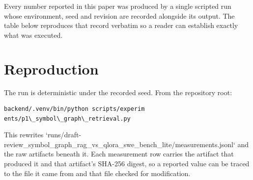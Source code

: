 \documentclass[10pt,journal,compsoc,twocolumn]{IEEEtran}
\begin{document}
Every number reported in this paper was produced by a single scripted run whose environment, seed and revision are recorded alongside its output. The table below reproduces that record verbatim so a reader can establish exactly what was executed.
\begin{table}[htbp]
\centering
{}
\end{table}


\section{Reproduction}


The run is deterministic under the recorded seed. From the repository root:


\begin{scriptsize}
\begin{verbatim}
backend/.venv/bin/python scripts/experim
ents/p1\_symbol\_graph\_retrieval.py
\end{verbatim}
\end{scriptsize}


This rewrites `runs/draft-review\_symbol\_graph\_rag\_vs\_qlora\_swe\_bench\_lite/measurements.jsonl` and the raw artifacts beneath it. Each measurement row carries the artifact that produced it and that artifact's SHA-256 digest, so a reported value can be traced to the file it came from and that file checked for modification.
\end{document}
